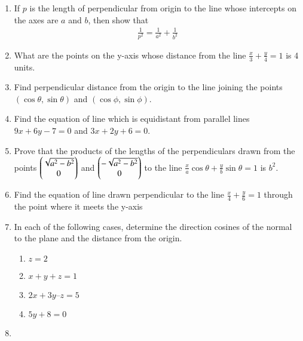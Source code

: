 \begin{enumerate}[label=\thesection.\arabic*,ref=\thesection.\theenumi]
\label{chapters/11/10/3/17}
\\
\solution

\item If $p$ is the length of perpendicular from origin to the line whose intercepts on the axes are $a$ and $b$, then show that 
\begin{align}
	\frac{1}{p^2} = \frac{1}{a^2}+ \frac{1}{b^2}
\end{align}
\label{chapters/11/10/3/18}

\item What are the points on the y-axis whose distance from the line $\frac{x}{3}+\frac{y}{4}=1$ is 4 units.
\\
\solution
		
\item Find perpendicular distance from the origin to the line joining the points$(\cos\theta,\sin\theta)$ and $(\cos\phi,\sin\phi)$.
\\
\solution
		
\item Find the equation of line which is equidistant from parallel lines $9x+6y-7=0$ and $3x+2y+6=0$.
\\
\solution
		
	\item Prove that the products of the lengths of the perpendiculars drawn from the points $\begin{pmatrix}\sqrt{a^2-b^2}\\0\end{pmatrix}$ and $\begin{pmatrix}-\sqrt{a^2-b^2} \\0\end{pmatrix} $ to the line $\frac{x}{a} \cos{\theta} + \frac{y}{b}\sin{\theta} =1 $ is $ b^2 $.
\\
    \solution 
		
\item Find the equation of line  drawn perpendicular to the line $\frac{x}{4}+\frac{y}{6}=1$ through the point where it meets the y-axis \\
\solution
		
 \item  In each of the following cases, determine the direction cosines of the normal to
the plane and the distance from the origin.
\begin{enumerate}
	\item $z=2$ 
	\item $x + y + z = 1$
	\item $2x + 3y – z = 5$
	\item $5y + 8 = 0$
\end{enumerate}
    \solution
		
\item

\end{enumerate}
